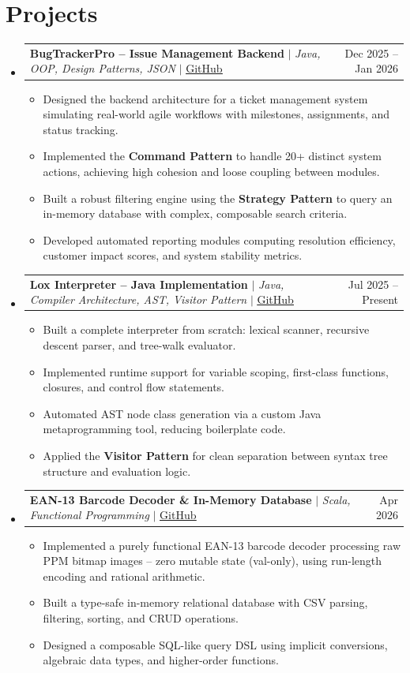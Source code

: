 \documentclass[letterpaper,11pt]{article}
\makeatletter
\newcommand{\resumeItem}[1]{
  \item\small{
    {#1 \vspace{-2pt}}
  }
}
\newcommand{\resumeProjectHeading}[2]{
    \item
    \begin{tabular*}{0.97\textwidth}{l@{\extracolsep{\fill}}r}
      \small#1 & \small #2 \\
    \end{tabular*}\vspace{-7pt}
}
\newcommand{\resumeSubHeadingListStart}{\begin{itemize}[leftmargin=0.15in, label={}]}
\newcommand{\resumeSubHeadingListEnd}{\end{itemize}}
\newcommand{\resumeItemListStart}{\begin{itemize}}
\newcommand{\resumeItemListEnd}{\end{itemize}\vspace{-5pt}}
\makeatother
\begin{document}
\section{Projects}
    \resumeSubHeadingListStart
      \resumeProjectHeading
          {\textbf{BugTrackerPro -- Issue Management Backend} $|$ \emph{Java, OOP, Design Patterns, JSON} $|$ \href{https://github.com/RaduAndreiTudorica}{\underline{GitHub}}}{Dec 2025 -- Jan 2026}
          \resumeItemListStart
            \resumeItem{Designed the backend architecture for a ticket management system simulating real-world agile workflows with milestones, assignments, and status tracking.}
            \resumeItem{Implemented the \textbf{Command Pattern} to handle 20+ distinct system actions, achieving high cohesion and loose coupling between modules.}
            \resumeItem{Built a robust filtering engine using the \textbf{Strategy Pattern} to query an in-memory database with complex, composable search criteria.}
            \resumeItem{Developed automated reporting modules computing resolution efficiency, customer impact scores, and system stability metrics.}
          \resumeItemListEnd

      \resumeProjectHeading
          {\textbf{Lox Interpreter -- Java Implementation} $|$ \emph{Java, Compiler Architecture, AST, Visitor Pattern} $|$ \href{https://github.com/RaduAndreiTudorica}{\underline{GitHub}}}{Jul 2025 -- Present}
          \resumeItemListStart
            \resumeItem{Built a complete interpreter from scratch: lexical scanner, recursive descent parser, and tree-walk evaluator.}
            \resumeItem{Implemented runtime support for variable scoping, first-class functions, closures, and control flow statements.}
            \resumeItem{Automated AST node class generation via a custom Java metaprogramming tool, reducing boilerplate code.}
            \resumeItem{Applied the \textbf{Visitor Pattern} for clean separation between syntax tree structure and evaluation logic.}
          \resumeItemListEnd

      \resumeProjectHeading
          {\textbf{EAN-13 Barcode Decoder \& In-Memory Database} $|$ \emph{Scala, Functional Programming} $|$ \href{https://github.com/RaduAndreiTudorica/CashRegister}{\underline{GitHub}}}{Apr 2026}
          \resumeItemListStart
            \resumeItem{Implemented a purely functional EAN-13 barcode decoder processing raw PPM bitmap images -- zero mutable state (val-only), using run-length encoding and rational arithmetic.}
            \resumeItem{Built a type-safe in-memory relational database with CSV parsing, filtering, sorting, and CRUD operations.}
            \resumeItem{Designed a composable SQL-like query DSL using implicit conversions, algebraic data types, and higher-order functions.}
          \resumeItemListEnd
    \resumeSubHeadingListEnd
\end{document}
